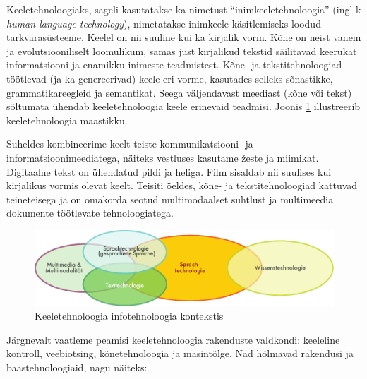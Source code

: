 \documentclass[]{../metanetpaper}
\begin{document}
\clearpage



\begin{multicols}{2}


Keeletehnoloogiaks, sageli kasutatakse ka nimetust ``inimkeeletehnoloogia'' (ingl k \textit{human language technology}), nimetatakse inimkeele käsitlemiseks loodud tarkvarasüsteeme. 
Keelel on nii suuline kui ka kirjalik vorm. 
Kõne on neist vanem ja evolutsiooniliselt loomulikum, samas just kirjalikud tekstid säilitavad keerukat informatsiooni ja enamikku inimeste teadmistest. 
Kõne- ja tekstitehnoloogiad töötlevad (ja ka genereerivad) keele eri vorme, kasutades selleks sõnastikke, grammatikareegleid ja semantikat. 
Seega väljendavast meediast (kõne või tekst) sõltumata ühendab keeletehnoloogia keele erinevaid teadmisi. 
Joonis \ref{fig:ltincontext_ee} illustreerib keeletehnoloogia maastikku. 

Suheldes kombineerime keelt teiste kommunikat\-siooni- ja informatsioonimeediatega, näiteks vestluses kasutame žeste ja miimikat. 
Digitaalne tekst on ühendatud pildi ja heliga. 
Film sisaldab nii suulises kui kirjalikus vormis olevat keelt. 
Teisiti öeldes, kõne- ja tekstitehnoloogiad kattuvad teineteisega ja on omakorda seotud multimodaalset suhtlust ja multimeedia dokumente töötlevate tehnoloogiatega. 

\begin{figure}[htb]
  \center
  \includegraphics[width=\textwidth]{../_media/german/language_technologies}
  \caption{Keeletehnoloogia infotehnoloogia kontekstis}
  \label{fig:ltincontext_ee}
\end{figure}

Järgnevalt vaatleme peamisi keeletehnoloogia rakenduste valdkondi: keeleline kontroll, veebiotsing, kõnetehnoloogia ja masintõlge. 
Nad hõlmavad rakendusi ja baastehnoloogiaid, nagu näiteks:


\end{multicols}
\end{document}
